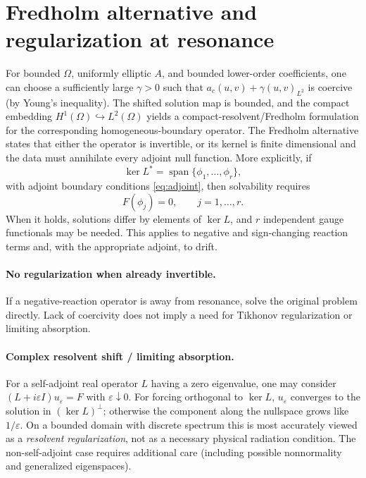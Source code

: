 \documentclass[11pt,letterpaper]{article}
\newcommand{\Om}{\Omega}
\newcommand{\Ker}{\operatorname{ker}}
\begin{document}
\section{Fredholm alternative and regularization at resonance}
For bounded $\Om$, uniformly elliptic $A$, and bounded lower-order
coefficients, one can choose a sufficiently large $\gamma>0$ such that
$a_c(u,v)+\gamma(u,v)_{L^2}$ is coercive (by Young's inequality).
The shifted solution map is bounded, and the compact embedding
$H^1(\Om)\hookrightarrow L^2(\Om)$ yields a compact-resolvent/Fredholm
formulation for the corresponding homogeneous-boundary operator.
The Fredholm alternative states that either the operator is invertible, or
its kernel is finite dimensional and the data must annihilate every adjoint
null function. More explicitly, if
\begin{equation}\label{eq:fredholm}
 \Ker L^*=\operatorname{span}\{\phi_1,\ldots,\phi_r\},
\end{equation}
with adjoint boundary conditions \eqref{eq:adjoint}, then solvability requires
\begin{equation}\label{eq:fredholmcompat}
 \boxed{F(\phi_j)=0,\qquad j=1,\ldots,r.}
\end{equation}
When it holds, solutions differ by elements of $\Ker L$, and $r$
independent gauge functionals may be needed. This applies to negative and
sign-changing reaction terms and, with the appropriate adjoint, to drift.

\paragraph{No regularization when already invertible.}
If a negative-reaction operator is away from resonance, solve the original
problem directly. Lack of coercivity does not imply a need for Tikhonov
regularization or limiting absorption.

\paragraph{Complex resolvent shift / limiting absorption.}
For a self-adjoint real operator $L$ having a zero eigenvalue, one may
consider $(L+i\varepsilon I)u_\varepsilon=F$ with
$\varepsilon\downarrow0$. For forcing orthogonal to $\Ker L$,
$u_\varepsilon$ converges to the solution in $(\Ker L)^\perp$; otherwise
the component along the nullspace grows like $1/\varepsilon$.
On a bounded domain with discrete spectrum this is most accurately viewed
as a \emph{resolvent regularization}, not as a necessary physical radiation
condition. The non-self-adjoint case requires additional care (including
possible nonnormality and generalized eigenspaces).
\end{document}
